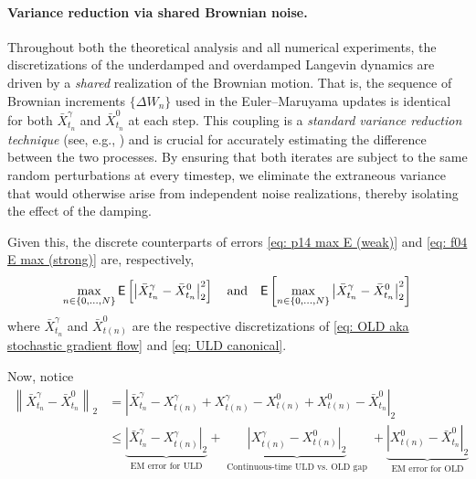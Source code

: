 \documentclass[12pt]{article}
\begin{document}
\paragraph{Variance reduction via shared Brownian noise.}
Throughout both the theoretical analysis and all numerical experiments, the discretizations of the underdamped and overdamped Langevin dynamics are driven by a \emph{shared} realization of the Brownian motion. That is, the sequence of Brownian increments $\{\Delta W_n\}$ used in the Euler--Maruyama updates is identical for both $\bar{X}_{t_n}^\gamma$ and $\bar{X}_{t_n}^0$ at each step. This coupling is a \emph{standard variance reduction technique} (see, e.g., \cite[Ch. 9]{kloeden1992numerical}) and is crucial for accurately estimating the difference between the two processes. By ensuring that both iterates are subject to the same random perturbations at every timestep, we eliminate the extraneous variance that would otherwise arise from independent noise realizations, thereby isolating the effect of the damping.

Given this, the discrete counterparts of errors \eqref{eq: p14 max E (weak)} and \eqref{eq: f04 E max (strong)} are, respectively,
\begin{gather*}
    \max_{n\in\{0,...,N\}}{\mathsf E}\left[\left|\bar{X}_{t_n}^\gamma-\bar{X}_{t_n}^0\right|_2^2\right]\quad\text{and}\quad{\mathsf E}\left[\max_{n\in\{0,...,N\}}\left|\bar{X}_{t_n}^\gamma-\bar{X}_{t_n}^0\right|_2^2\right]
\end{gather*}
where $\bar{X}_{t_n}^\gamma$ and $\bar{X}_{t(n)}^0$ are the respective discretizations of \eqref{eq: OLD aka stochastic gradient flow} and \eqref{eq: ULD canonical}.

Now, notice \begin{align}
\label{eq: underbrace}
\left\|\bar{X}_{t_n}^\gamma - \bar{X}_{t_n}^0\right\|_2
&= \left|\bar{X}_{t_n}^\gamma - X_{t(n)}^\gamma
    + X_{t(n)}^\gamma - X_{t(n)}^0
    + X_{t(n)}^0 - \bar{X}_{t_n}^0\right|_2\nonumber\\[1em]
&\leq
\underbrace{
    \left| \bar{X}_{t_n}^\gamma - X_{t(n)}^\gamma \right|_2
}_{\substack{
    \text{EM error for ULD}
}}
+
\underbrace{
    \left| X_{t(n)}^\gamma - X_{t(n)}^0 \right|_2
}_{\substack{
    \text{Continuous-time ULD vs. OLD gap}
}}
+
\underbrace{
    \left| X_{t(n)}^0 - \bar{X}_{t_n}^0 \right|_2
}_{\substack{
    \text{EM error for OLD}
}}
\end{align}
\end{document}
